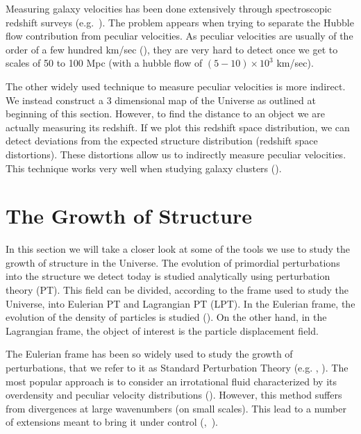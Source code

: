 Measuring galaxy velocities has been done extensively through spectroscopic redshift surveys (e.g.~\cite{2013AJ....145...10D}). The problem appears when trying to separate the Hubble flow contribution from peculiar velocities. As peculiar velocities are usually of the order of a few hundred km/sec (\cite{dodelson2003modern}), they are very hard to detect once we get to scales of 50 to 100 Mpc (with a hubble flow of $(5-10) \times 10^3$ km/sec). 

The other widely used technique to measure peculiar velocities is more indirect. We instead construct a 3 dimensional map of the Universe as outlined at beginning of this section. However, to find the distance to an object we are actually measuring its redshift. If we plot this redshift space distribution, we can detect deviations from the expected structure distribution (redshift space distortions). These distortions allow us to indirectly measure peculiar velocities. This technique works very well when studying galaxy clusters (\cite{dodelson2003modern}).

    
    

\section{The Growth of Structure}

In this section we will take a closer look at some of the tools we use to study the growth of structure in the Universe. The evolution of primordial perturbations into the structure we detect today is studied analytically using perturbation theory (PT). This field can be divided, according to the frame used to study the Universe, into Eulerian PT and Lagrangian PT (LPT). In the Eulerian frame, the evolution of the density of particles is studied (\cite{Bernardeau_PT}). On the other hand, in the Lagrangian frame, the object of interest is the particle displacement field.

The Eulerian frame has been so widely used to study the growth of perturbations, that we refer to it as Standard Perturbation Theory (e.g. \cite{1983MNRAS.203..345V}, \cite{peebles1980large}). The most popular approach is to consider an irrotational fluid characterized by its overdensity and peculiar velocity distributions (\cite{Carlson_perturbation_theory}). However, this method suffers from divergences at large wavenumbers (on small scales). This lead to a number of extensions meant to bring it under control (\cite{2006PhRvD..73f3519C},~\cite{2008PhRvD..77b3533C}). 

